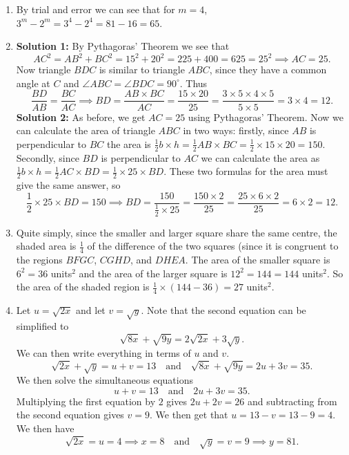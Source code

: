 \documentclass[12pt]{article}
\begin{document}
\begin{enumerate}[topsep=\bigskipamount,itemsep=\bigskipamount]
\item By trial and error we can see that for $m=4$, $3^m-2^m = 3^4-2^4 = 81-16 = 65$.

\item \textbf{Solution 1:} By Pythagoras' Theorem we see that
\[ AC^2 = AB^2 +BC^2 = 15^2 +20^2 = 225+400 = 625 = 25^2 \implies AC = 25. \]
Now triangle $BDC$ is similar to triangle $ABC$, since they have a common angle at $C$ and $\angle ABC = \angle BDC = 90^\circ$.
Thus
\[ \frac{BD}{AB} = \frac{BC}{AC} \implies BD = \frac{AB \times BC}{AC} = \frac{15 \times 20}{25} = \frac{3 \times 5 \times 4 \times 5}{5 \times 5} = 3 \times 4 = 12. \]
\textbf{Solution 2:} As before, we get $AC = 25$ using Pythagoras' Theorem.
Now we can calculate the area of triangle $ABC$ in two ways: firstly, since $AB$ is perpendicular to $BC$ the area is $\frac{1}{2}b\times h = \frac{1}{2} AB \times BC = \frac{1}{2} \times 15 \times 20 = 150$.
Secondly, since $BD$ is perpendicular to $AC$ we can calculate the area as $\frac{1}{2} b\times h = \frac{1}{2} AC \times BD = \frac{1}{2} \times 25 \times BD$.
These two formulas for the area must give the same answer, so
\[ \frac{1}{2} \times 25 \times BD = 150 \implies BD = \frac{150}{\frac{1}{2} \times 25} = \frac{150 \times 2}{25} = \frac{25 \times 6 \times 2}{25} = 6 \times 2 = 12. \]


\item Quite simply, since the smaller and larger square share the same centre, the shaded area is $\frac{1}{4}$ of the difference of the two squares (since it is congruent to the regions $BFGC$, $CGHD$, and $DHEA$.
The area of the smaller square is $6^2=36$ units$^2$ and the area of the larger square is $12^2 = 144 = 144$ units$^2$.
So the area of the shaded region is $\frac{1}{4}\times (144-36) = 27$ units$^2$.

\item Let $u=\sqrt{2x}$ and let $v=\sqrt{y}$. Note that the second equation can be simplified to 
\begin{equation*}
    \sqrt{8x}+\sqrt{9y}= 2\sqrt{2x}+3\sqrt{y}.
\end{equation*}
We can then write everything in terms of $u$ and $v$. 
\begin{equation*}
    \sqrt{2x}+\sqrt{y}= u+v=13 \quad\text{and}\quad \sqrt{8x}+\sqrt{9y}=2u+3v=35.
\end{equation*}
We then solve the simultaneous equations 
\begin{equation*}
    u+v=13 \quad \text{and}\quad 2u+3v=35.
\end{equation*}
Multiplying the first equation by $2$ gives $2u+2v=26$ and subtracting from the second equation gives $v=9$. We then get that $u= 13-v=13-9=4$. We then have 
\begin{equation*}
    \sqrt{2x}=u=4 \implies x=8 \quad\text{and}\quad \sqrt{y}=v=9 \implies y=81.
\end{equation*}


\end{enumerate}
\end{document}

